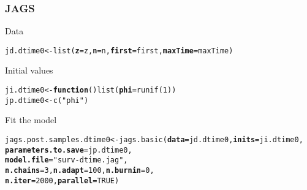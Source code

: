 \documentclass[color=usenames,dvipsnames]{beamer}\usepackage[]{graphicx}\usepackage[]{color}
\makeatletter
\newcommand{\hlnum}[1]{\textcolor[rgb]{0.69,0.494,0}{#1}}%
\newcommand{\hlstr}[1]{\textcolor[rgb]{0.749,0.012,0.012}{#1}}%
\newcommand{\hlstd}[1]{\textcolor[rgb]{0,0,0}{#1}}%
\newcommand{\hlkwa}[1]{\textcolor[rgb]{0,0,0}{\textbf{#1}}}%
\newcommand{\hlkwb}[1]{\textcolor[rgb]{0,0.341,0.682}{#1}}%
\newcommand{\hlkwc}[1]{\textcolor[rgb]{0,0,0}{\textbf{#1}}}%
\newcommand{\hlkwd}[1]{\textcolor[rgb]{0.004,0.004,0.506}{#1}}%
\newenvironment{kframe}{%
 \def\at@end@of@kframe{}%
 \ifinner\ifhmode%
  \def\at@end@of@kframe{\end{minipage}}%
  \begin{minipage}{\columnwidth}%
 \fi\fi%
 \def\FrameCommand##1{\hskip\@totalleftmargin \hskip-\fboxsep
 \colorbox{shadecolor}{##1}\hskip-\fboxsep
     \hskip-\linewidth \hskip-\@totalleftmargin \hskip\columnwidth}%
 \MakeFramed {\advance\hsize-\width
   \@totalleftmargin\z@ \linewidth\hsize
   \@setminipage}}%
 {\par\unskip\endMakeFramed%
 \at@end@of@kframe}
\newenvironment{knitrout}{}{} %
\makeatother
\begin{document}
\begin{frame}[fragile]
  \frametitle{JAGS}
  Data
\begin{knitrout}\scriptsize
{}\color{fgcolor}\begin{kframe}
\begin{alltt}
\hlstd{jd.dtime0} \hlkwb{<-} \hlkwd{list}\hlstd{(}\hlkwc{z}\hlstd{=z,} \hlkwc{n}\hlstd{=n,} \hlkwc{first}\hlstd{=first,} \hlkwc{maxTime}\hlstd{=maxTime)}
\end{alltt}
\end{kframe}
\end{knitrout}
  Initial values
  \scriptsize
\begin{knitrout}\scriptsize
{}\color{fgcolor}\begin{kframe}
\begin{alltt}
\hlstd{ji.dtime0} \hlkwb{<-} \hlkwa{function}\hlstd{()} \hlkwd{list}\hlstd{(}\hlkwc{phi}\hlstd{=}\hlkwd{runif}\hlstd{(}\hlnum{1}\hlstd{))}
\hlstd{jp.dtime0} \hlkwb{<-} \hlkwd{c}\hlstd{(}\hlstr{"phi"}\hlstd{)}
\end{alltt}
\end{kframe}
\end{knitrout}
\pause
\vfill
  {\normalsize Fit the model}
\begin{knitrout}\scriptsize
{}\color{fgcolor}\begin{kframe}
\begin{alltt}
\hlstd{jags.post.samples.dtime0} \hlkwb{<-} \hlkwd{jags.basic}\hlstd{(}\hlkwc{data}\hlstd{=jd.dtime0,} \hlkwc{inits}\hlstd{=ji.dtime0,}
                                       \hlkwc{parameters.to.save}\hlstd{=jp.dtime0,}
                                       \hlkwc{model.file}\hlstd{=}\hlstr{"surv-dtime.jag"}\hlstd{,}
                                       \hlkwc{n.chains}\hlstd{=}\hlnum{3}\hlstd{,} \hlkwc{n.adapt}\hlstd{=}\hlnum{100}\hlstd{,} \hlkwc{n.burnin}\hlstd{=}\hlnum{0}\hlstd{,}
                                       \hlkwc{n.iter}\hlstd{=}\hlnum{2000}\hlstd{,} \hlkwc{parallel}\hlstd{=}\hlnum{TRUE}\hlstd{)}
\end{alltt}
\end{kframe}
\end{knitrout}
\end{frame}
\end{document}

